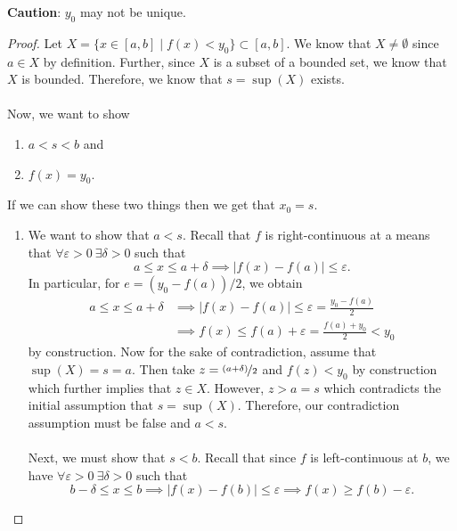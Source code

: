 \documentclass{article}
\newcommand{\set}[2]{\{ #1 \mid #2 \}}
\newcommand{\?}{\stackrel{?}{=}}
\theoremstyle{definition} %
\begin{document}
\begin{itemize}
\begin{theorem}
              \danger \textbf{Caution}: $y_0$ may not be unique.
              \label{theorem:ivt}
          \end{theorem}
          \begin{proof}
              Let $X = \set{x \in [a, b]}{f(x) < y_0} \subset [a, b]$. We know that $X \neq \emptyset$ since $a \in X$ by definition. Further, since $X$ is a subset of a bounded set, we know that $X$ is bounded. Therefore, we know that $s = \sup(X)$ exists. \\\\
              Now, we want to show
              \begin{enumerate}[label=(\roman*)]
                  \item $a < s < b$ and
                  \item $f(x) = y_0$.
              \end{enumerate}
              If we can show these two things then we get that $x_0 = s$.
              \begin{enumerate}[label=(\roman*)]
                  \item We want to show that $a < s$. Recall that $f$ is right-continuous at a means that $\forall \varepsilon > 0 \ \exists \delta > 0$ such that
                        $$a \leq x \leq a + \delta \implies |f(x) - f(a)| \leq \varepsilon.$$
                        In particular, for $e = (y_0 - f(a)) / 2$, we obtain
                        \begin{align*}
                            a \leq x \leq a + \delta & \implies |f(x) - f(a)| \leq \varepsilon = \frac{y_0 - f(a)}{2}     \\
                                                     & \implies f(x) \leq f(a) + \varepsilon = \frac{f(a) + y_0}{2} < y_0
                        \end{align*}
                        by construction. Now for the sake of contradiction, assume that $\sup(X) = s = a$. Then take $z = \nicefrac{(a + \delta)}{2}$ and $f(z) < y_0$ by construction which further implies that $z \in X$. However, $z > a = s$ which contradicts the initial assumption that $s = \sup(X)$. Therefore, our contradiction assumption must be false and $a < s$. \\\\
                        Next, we must show that $s < b$. Recall that since $f$ is left-continuous at $b$, we have $\forall \varepsilon > 0 \ \exists \delta > 0$ such that
                        $$b - \delta \leq x \leq b \implies |f(x) - f(b)| \leq \varepsilon \implies f(x) \geq f(b) - \varepsilon.$$

\end{enumerate}
\end{proof}
\end{itemize}
\end{document}
